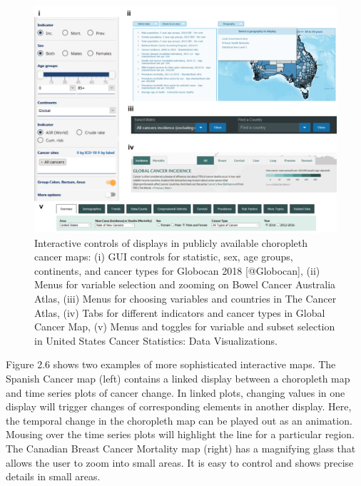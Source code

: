 \documentclass{monashthesis}
\begin{document}
\begin{figure}

{\centering \includegraphics[width=1\linewidth]{figures/02-literature/interacting} 

}

\caption{ Interactive controls of displays in publicly available choropleth cancer maps: (i) GUI controls for statistic, sex, age groups, continents, and cancer types for Globocan 2018 [@Globocan], (ii) Menus for variable selection and zooming on Bowel Cancer Australia Atlas, (iii) Menus for choosing variables and countries in The Cancer Atlas, (iv) Tabs for different indicators and cancer types in Global Cancer Map, (v) Menus and toggles for variable and subset selection in United States Cancer Statistics: Data Visualizations.}\label{fig:interacting}
\end{figure}

Figure 2.6 shows two examples of more sophisticated interactive maps. The Spanish Cancer map (left) contains a linked display between a choropleth map and time series plots of cancer change. In linked plots, changing values in one display will trigger changes of corresponding elements in another display. Here, the temporal change in the choropleth map can be played out as an animation. Mousing over the time series plots will highlight the line for a particular region. The Canadian Breast Cancer Mortality map (right) has a magnifying glass that allows the user to zoom into small areas. It is easy to control and shows precise details in small areas.
\end{document}
